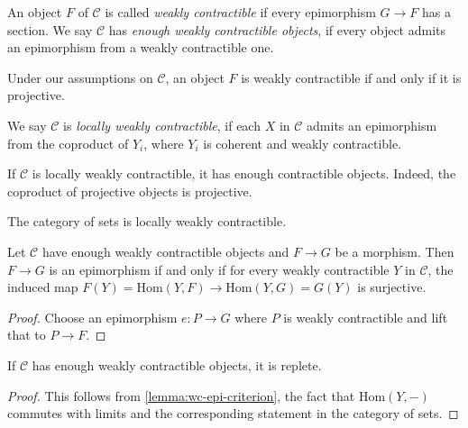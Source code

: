\begin{definition}
    An object $F$ of $\mathcal{C}$ is called \emph{weakly contractible} if every epimorphism
    $G \to F$ has a section. We say $\mathcal{C}$ has \emph{enough weakly contractible objects},
    if every object admits an epimorphism from a weakly contractible one.
    \label{def:weakly-contractible}
    \leanok
\end{definition}

\begin{remark}
    Under our assumptions on $\mathcal{C}$, an object $F$ is weakly contractible if and only
    if it is projective.
    \leanok
\end{remark}

\begin{definition}
    We say $\mathcal{C}$ is \emph{locally weakly contractible},
    if each $X$ in $\mathcal{C}$ admits an epimorphism from the coproduct of $Y_i$,
    where $Y_i$ is coherent and weakly contractible.
    \label{def:lwc}
\end{definition}

\begin{remark}
    If $\mathcal{C}$ is locally weakly contractible, it has enough contractible objects. Indeed,
    the coproduct of projective objects is projective.
\end{remark}

\begin{example}
    The category of sets is locally weakly contractible.
\end{example}

\begin{lemma}
    Let $\mathcal{C}$ have enough weakly contractible objects and $F \to G$ be a morphism.
    Then $F \to G$ is an epimorphism if and only if for every
    weakly contractible $Y$ in $\mathcal{C}$, the induced map
    $F(Y) = \mathrm{Hom}(Y, F) \to \mathrm{Hom}(Y, G) = G(Y)$ is
    surjective.
    \label{lemma:wc-epi-criterion}
    \leanok
\end{lemma}

\begin{proof}
    Choose an epimorphism $e \colon P \to G$ where $P$ is weakly contractible
    and lift that to $P \to F$.
    \leanok
\end{proof}

\begin{proposition}
    If $\mathcal{C}$ has enough weakly contractible objects, it is replete.
    \label{prop:wc-replete}
\end{proposition}

\begin{proof}
    This follows from \ref{lemma:wc-epi-criterion}, the fact that $\mathrm{Hom}(Y, -)$ commutes with
    limits and the corresponding statement in the category of sets.
\end{proof}
